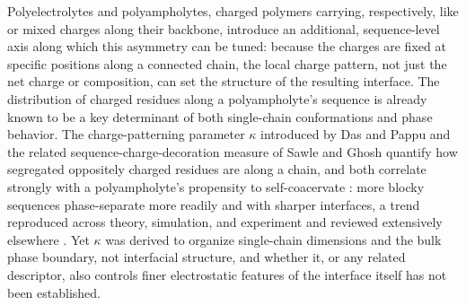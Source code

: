\documentclass[journal=amlccd,manuscript=article,layout=twocolumn]{achemso}
\begin{document}
Polyelectrolytes and polyampholytes, charged polymers carrying, respectively, like or mixed charges along their backbone, introduce an additional, sequence-level axis along which this asymmetry can be tuned: because the charges are fixed at specific positions along a connected chain, the local charge pattern, not just the net charge or composition, can set the structure of the resulting interface. The distribution of charged residues along a polyampholyte's sequence is already known to be a key determinant of both single-chain conformations and phase behavior\cite{dasConformationsIntrinsicallyDisordered2013,dasRelatingSequenceEncoded2015,sawleTheoreticalMethodCompute2015}. The charge-patterning parameter $\kappa$ introduced by Das and Pappu\cite{dasConformationsIntrinsicallyDisordered2013} and the related sequence-charge-decoration measure of Sawle and Ghosh \cite{sawleTheoreticalMethodCompute2015} quantify how segregated oppositely charged residues are along a chain, and both correlate strongly with a polyampholyte's propensity to self-coacervate \cite{linSequenceSpecificPolyampholytePhase2016,pakSequenceDeterminantsIntracellular2016}: more blocky sequences phase-separate more readily and with sharper interfaces, a trend reproduced across theory, simulation, and experiment and reviewed extensively elsewhere \cite{linTheoriesSequenceDependentPhase2018,holehouseCIDERResourcesAnalyze2017,ghoshRulesPhysicalMathematics2022}. Yet $\kappa$ was derived to organize single-chain dimensions and the bulk phase boundary, not interfacial structure, and whether it, or any related descriptor, also controls finer electrostatic features of the interface itself has not been established.
\end{document}
